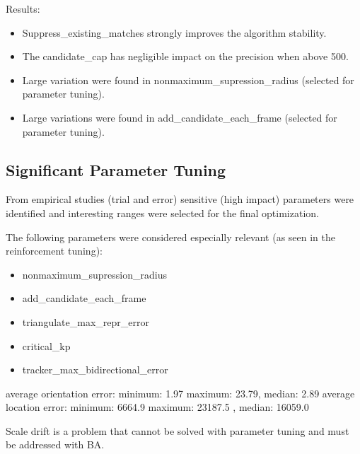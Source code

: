 Results:
\begin{itemize}
    \item Suppress\_existing\_matches strongly improves the algorithm stability.
    \item The candidate\_cap has negligible impact on the precision when above 500.
    \item Large variation were found in nonmaximum\_supression_radius (selected for parameter tuning).
    \item Large variations were found in add\_candidate\_each\_frame (selected for parameter tuning).
\end{itemize}

\subsection{Significant Parameter Tuning}  
From empirical studies (trial and error) sensitive (high impact) parameters were identified and interesting ranges were selected for the final optimization.

The following parameters were considered especially relevant (as seen in the reinforcement tuning):

\begin{itemize}
    \item nonmaximum\_supression\_radius
    \item add\_candidate\_each\_frame
    \item triangulate\_max\_repr\_error
    \item critical\_kp
    \item tracker\_max\_bidirectional\_error
\end{itemize}




average orientation error: minimum: 1.97 maximum: 23.79, median: 2.89
average location error: minimum: 6664.9 maximum: 23187.5 , median: 16059.0





Scale drift is a problem that cannot be solved with parameter tuning and must be addressed with BA.



